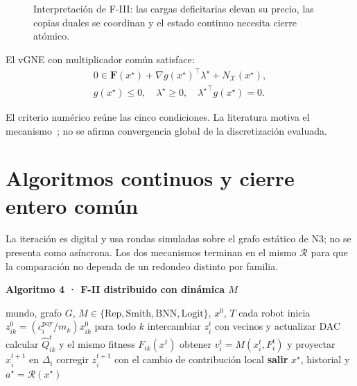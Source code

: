 \begin{figure}[H]
\centering
\vspace{-3mm}
\scalebox{.58}{}
\caption{Interpretación de F-III: las cargas deficitarias elevan su precio,
las copias duales se coordinan y el estado continuo necesita cierre atómico.}
\label{fig:n4-primal-dual}
\viuownsource
\end{figure}
\vspace{-3mm}

El vGNE con multiplicador común satisface:
\begin{equation}
\label{eq:n4-vgne-kkt}
\begin{gathered}
0\in\mathbf F(x^\star)+\nabla g(x^\star)^\top\lambda^\star
+N_{\mathcal X}(x^\star),\\[-1mm]
g(x^\star)\le0,\quad\lambda^\star\ge0,\quad
{\lambda^\star}^{\!\top}g(x^\star)=0.
\end{gathered}
\end{equation}

El criterio numérico reúne las cinco condiciones. La literatura motiva el
mecanismo~\parencite{cherukuri2016primalDual,yi2019operatorGNE}; no se afirma
convergencia global de la discretización evaluada.
\endgroup

\clearpage

\section*{Algoritmos continuos y cierre entero común}

La iteración es digital y usa rondas simuladas sobre el grafo estático de N3;
no se presenta como asíncrona. Los dos mecanismos terminan en el mismo
$\mathcal R$ para que la comparación no dependa de un redondeo distinto por
familia.

\begin{tcolorbox}[colback=SPBlue!3,colframe=SPBlue!65,boxrule=.6pt,arc=1mm,
 left=2mm,right=2mm,top=1.4mm,bottom=1.4mm]
\textbf{Algoritmo 4 · F-II distribuido con dinámica $M$}
\begin{algorithmic}[1]
\Require mundo, grafo $G$, $M\in\{\mathrm{Rep,Smith,BNN,Logit}\}$, $x^0$, $T$
\State cada robot inicia $z_{ik}^0=(c_i^{\mathrm{pay}}/m_k)x_{ik}^0$ para todo $k$
  \State intercambiar $z_i^t$ con vecinos y actualizar DAC
  \State calcular $\widehat Q_{ik}^t$ y el mismo fitness $F_{ik}(x^t)$
  \State obtener $v_i^t=M(x_i^t,F_i^t)$ y proyectar $x_i^{t+1}$ en $\Delta_i$
  \State corregir $z_i^{t+1}$ con el cambio de contribución local
   \State \textbf{salir} \EndIf
\EndFor
\State \Return $x^\star$, historial y $a^\star=\mathcal R(x^\star)$
\end{algorithmic}
\end{tcolorbox}

